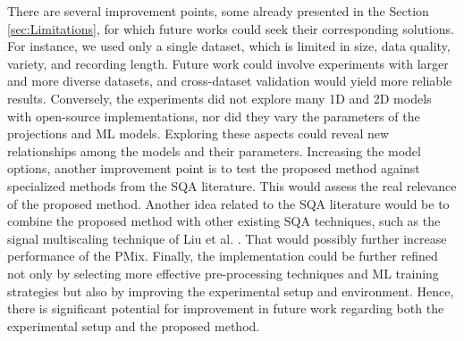 There are several improvement points, some already presented in the Section \ref{sec:Limitations}, for which future works could seek their corresponding solutions. 
For instance, we used only a single dataset, which is limited in size, data quality, variety, and recording length. Future work could involve experiments with larger and more diverse datasets, and cross-dataset validation would yield more reliable results.
Conversely, the experiments did not explore many 1D and 2D models with open-source implementations, nor did they vary the parameters of the projections and \gls{ML} models. Exploring these aspects could reveal new relationships among the models and their parameters.
Increasing the model options, another improvement point is to test the proposed method against specialized methods from the SQA literature. This would assess the real relevance of the proposed method.
Another idea related to the \gls{SQA} literature would be to combine the proposed method with other existing \gls{SQA} techniques, such as the signal multiscaling technique of Liu et al. \cite{imaging-6}. That would possibly further increase performance of the \gls{PMix}. 
Finally, the implementation could be further refined not only by selecting more effective pre-processing techniques and \gls{ML} training strategies but also by improving the experimental setup and environment.
Hence, there is significant potential for improvement in future work regarding both the experimental setup and the proposed method.
